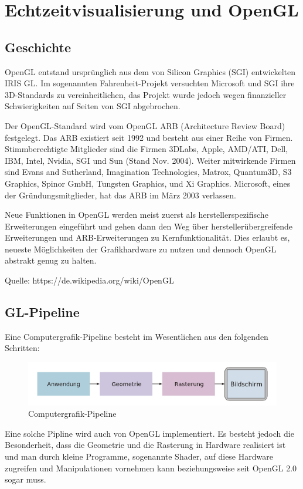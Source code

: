\section{Echtzeitvisualisierung und OpenGL}
\subsection{Geschichte}
OpenGL entstand ursprünglich aus dem von Silicon Graphics (SGI) entwickelten IRIS GL. Im sogenannten Fahrenheit-Projekt versuchten Microsoft und SGI ihre 3D-Standards zu vereinheitlichen, das Projekt wurde jedoch wegen finanzieller Schwierigkeiten auf Seiten von SGI abgebrochen.

Der OpenGL-Standard wird vom OpenGL ARB (Architecture Review Board) festgelegt. Das ARB existiert seit 1992 und besteht aus einer Reihe von Firmen. Stimmberechtigte Mitglieder sind die Firmen 3DLabs, Apple, AMD/ATI, Dell, IBM, Intel, Nvidia, SGI und Sun (Stand Nov. 2004). Weiter mitwirkende Firmen sind Evans and Sutherland, Imagination Technologies, Matrox, Quantum3D, S3 Graphics, Spinor GmbH, Tungsten Graphics, und Xi Graphics. Microsoft, eines der Gründungsmitglieder, hat das ARB im März 2003 verlassen.

Neue Funktionen in OpenGL werden meist zuerst als herstellerspezifische Erweiterungen eingeführt und gehen dann den Weg über herstellerübergreifende Erweiterungen und ARB-Erweiterungen zu Kernfunktionalität. Dies erlaubt es, neueste Möglichkeiten der Grafikhardware zu nutzen und dennoch OpenGL abstrakt genug zu halten.

Quelle: https://de.wikipedia.org/wiki/OpenGL
\subsection{GL-Pipeline}
Eine Computergrafik-Pipeline besteht im Wesentlichen aus den folgenden Schritten:
\begin{figure}[H]
    \centering
    \includegraphics[width=1.0\textwidth]{images/cgpipeline_grob.png}
    \caption{Computergrafik-Pipeline}
    \label{fig:gimbal+lock}
\end{figure}

Eine solche Pipline wird auch von OpenGL implementiert. Es besteht jedoch die Besonderheit, dass die Geometrie und die  Rasterung in Hardware realisiert ist und man durch kleine Programme, sogenannte Shader, auf diese Hardware zugreifen und Manipulationen vornehmen kann beziehungsweise seit OpenGL 2.0 sogar muss.

